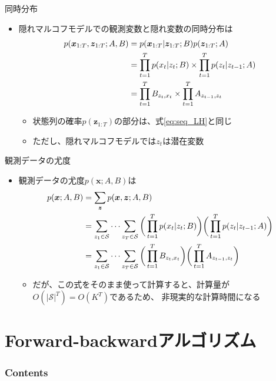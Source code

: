 \documentclass[aspectratio=169,unicode,dvipdfmx,14pt]{beamer}
\begin{document}
\begin{frame}{同時分布}
\begin{itemize}
\item 隠れマルコフモデルでの観測変数と隠れ変数の同時分布は
\begin{align}
p(\bm{x}_{1:T}, \bm{z}_{1:T};A,B)
& = p(\bm{x}_{1:T} | \bm{z}_{1:T};B) p(\bm{z}_{1:T};A)
\notag \\ &
= \prod_{t=1}^T p(x_t|z_t;B) \times \prod_{t=1}^T p(z_t|z_{t-1};A)
\notag \\ &
= \prod_{t=1}^T B_{z_t,x_t} \times \prod_{t=1}^T A_{z_{t-1},z_t}
\end{align}
\begin{itemize}
\item 状態列の確率$p(\bm{z}_{1:T})$の部分は、式\eqref{eq:seq_LH}と同じ
\item ただし、隠れマルコフモデルでは$z_t$は潜在変数
\end{itemize}
\end{itemize}
\end{frame}


\begin{frame}{観測データの尤度}
\begin{itemize}
\item 観測データの尤度$p(\bm{x}; A,B)$は
\begin{align}
p(\bm{x}; A,B) &
= \sum_{\bm{z}} p(\bm{x},\bm{z}; A,B)
\notag \\
& = \sum_{z_1 \in \mathcal{S}} \cdots \sum_{z_T \in \mathcal{S}}
\bigg( \prod_{t=1}^T p(x_t|z_t;B) \bigg) \bigg( \prod_{t=1}^T p(z_t|z_{t-1};A) \bigg)
\notag \\ & 
= \sum_{z_1 \in \mathcal{S}} \cdots \sum_{z_T \in \mathcal{S}} \bigg( \prod_{t=1}^T B_{z_t,x_t} \bigg)
\bigg( \prod_{t=1}^T A_{z_{t-1},z_t} \bigg)
\end{align}
\vspace{-.1in}
\begin{itemize}
\item だが、この式をそのまま使って計算すると、計算量が$O(|\mathcal{S}|^T) = O(K^T)$であるため、
非現実的な計算時間になる
\end{itemize}
\end{itemize}
\end{frame}

\section{Forward-backwardアルゴリズム}

\begin{frame}\frametitle{Contents}
\Large \tableofcontents[currentsection]
\end{frame}
\end{document}
